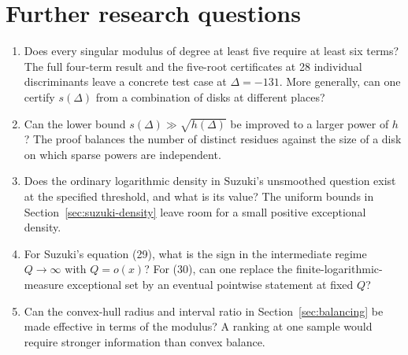 \documentclass[11pt,letterpaper]{article}
\begin{document}
\section{Further research questions}
\begin{enumerate}
\item Does every singular modulus of degree at least five require at least six terms? The full four-term result and the five-root certificates at 28 individual discriminants leave a concrete test case at $\Delta=-131$. More generally, can one certify $s(\Delta)$ from a combination of disks at different places?
\item Can the lower bound $s(\Delta)\gg\sqrt{h(\Delta)}$ be improved to a larger power of $h$? The proof balances the number of distinct residues against the size of a disk on which sparse powers are independent.
\item Does the ordinary logarithmic density in Suzuki's unsmoothed question exist at the specified threshold, and what is its value? The uniform bounds in Section~\ref{sec:suzuki-density} leave room for a small positive exceptional density.
\item For Suzuki's equation (29), what is the sign in the intermediate regime $Q\to\infty$ with $Q=o(x)$? For (30), can one replace the finite-logarithmic-measure exceptional set by an eventual pointwise statement at fixed $Q$?
\item Can the convex-hull radius and interval ratio in Section~\ref{sec:balancing} be made effective in terms of the modulus? A ranking at one sample would require stronger information than convex balance.
\end{enumerate}
\end{document}
